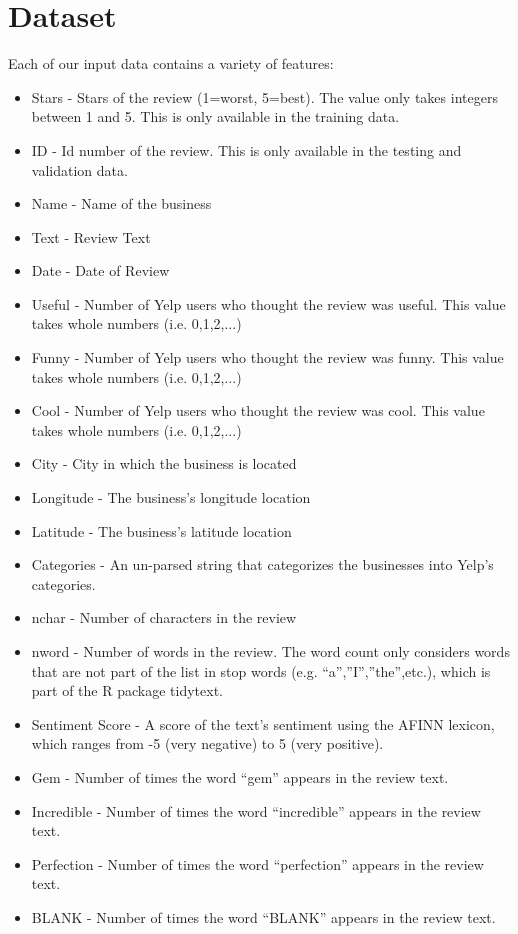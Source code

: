 \documentclass{article}
\begin{document}
\section{Dataset}
Each of our input data contains a variety of features:
\begin{itemize}
	\item Stars - Stars of the review (1=worst, 5=best). The value only takes integers between 1 and 5. This is only available in the training data.
	\item ID - Id number of the review. This is only available in the testing and
	validation data.
	\item Name - Name of the business
	\item Text - Review Text
	\item Date - Date of Review
	\item Useful - Number of Yelp users who thought the review was useful. This
	value takes whole numbers (i.e. 0,1,2,...)
	\item Funny - Number of Yelp users who thought the review was funny. This
	value takes whole numbers (i.e. 0,1,2,...)
	\item Cool - Number of Yelp users who thought the review was cool. This value
	takes whole numbers (i.e. 0,1,2,...)
	\item City - City in which the business is located
	\item Longitude - The business’s longitude location
	\item Latitude - The business’s latitude location
	\item Categories - An un-parsed string that categorizes the businesses into Yelp’s categories.
	\item nchar - Number of characters in the review
	\item nword - Number of words in the review. The word count only considers
	words that are not part of the list in stop words (e.g. “a”,”I”,”the”,etc.),
	which is part of the R package tidytext.
	\item Sentiment Score - A score of the text’s sentiment using the AFINN lexicon, which ranges from -5 (very negative) to 5 (very positive).
	\item Gem - Number of times the word “gem” appears in the review text.
	\item Incredible - Number of times the word “incredible” appears in the review
	text.
	\item Perfection - Number of times the word “perfection” appears in the review
	text.
	\item BLANK - Number of times the word “BLANK” appears in the review
	text.
\end{itemize}
\end{document}
